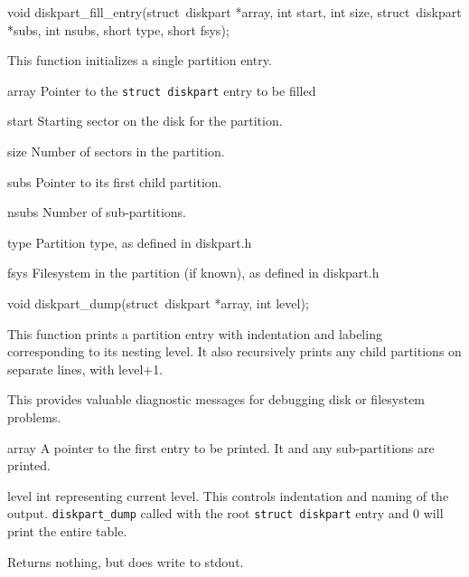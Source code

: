 \begin{apisyn}

        \funcproto void diskpart_fill_entry(struct~diskpart *array, 
		int start, int size,
                struct~diskpart *subs, int nsubs, short type, short fsys);
\end{apisyn}
\begin{apidesc}
        This function initializes a single partition entry.
\end{apidesc}
\begin{apiparm}
        \item[array]
		Pointer to the {\tt struct~diskpart} entry to be filled
	\item[start]
		Starting sector on the disk for the partition.
	\item[size]
		Number of sectors in the partition.
	\item[subs]
		Pointer to its first child partition.
	\item[nsubs]
		Number of sub-partitions.
	\item[type]
		Partition type, as defined in diskpart.h
	\item[fsys]
		Filesystem in the partition (if known), as defined in diskpart.h
\end{apiparm}


\begin{apisyn}

        \funcproto void diskpart_dump(struct~diskpart *array, int level);
\end{apisyn}
\begin{apidesc}
        This function prints a partition entry with indentation and labeling
	corresponding to its nesting level.  It also recursively prints any
	child partitions on separate lines, with level+1.

	This provides valuable diagnostic messages for debugging disk or
	filesystem problems.
\end{apidesc}
\begin{apiparm}
        \item[array]
		A pointer to the first entry to be printed.  It and any 
		sub-partitions are printed.
        \item[level]
		int representing current level.  This controls indentation and
		naming of the output.
		{\tt diskpart_dump} called with the root {\tt struct~diskpart}
		entry and 0 will print the entire table.
\end{apiparm}
\begin{apiret}
	Returns nothing, but does write to stdout.
\end{apiret}




